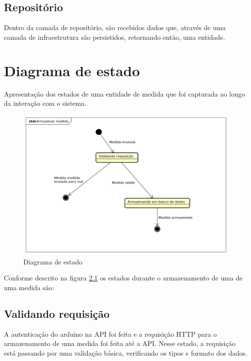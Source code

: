 \section{Repositório}

Dentro da camada de repositório, são recebidos dados que, através de uma camada de infraestrutura são persistidos, retornando então, uma entidade.

\chapter{Diagrama de estado}

Apresentação dos estados de uma entidade de medida que foi capturada ao longo da interação com o sistema.

\begin{figure}[H]
    \label{figure_diagrama_estado}
    \centering
    \caption{Diagrama de estado}
    \includegraphics[scale=0.6]{diagrams/estado.png}
    \hfill
\end{figure}

Conforme descrito na figura \ref{figure_diagrama_estado} os estados durante o armazenamento de uma de uma medida são:

\section{Validando requisição}

A autenticação do arduino na API foi feita e a requisição HTTP para o armazenamento de uma medida foi feita até a API.
Nesse estado, a requisição está passando por uma validação básica, verificando os tipos e formato dos dados.

